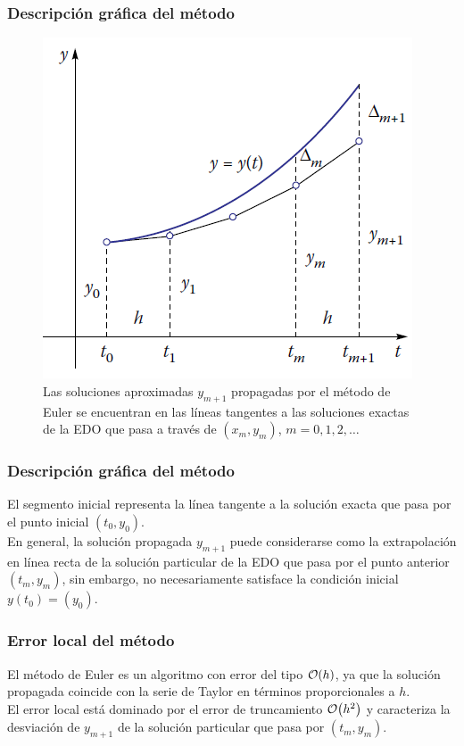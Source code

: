 \begin{frame}
\frametitle{Descripción gráfica del método}
\begin{figure}[h!]
    \centering
    \includegraphics[scale=0.5]{Imagenes/metodoEuler_01.png}
    \caption{Las soluciones aproximadas $y_{m + 1}$ propagadas por el método de Euler se encuentran en las líneas tangentes a las soluciones exactas de la EDO que pasa a través de $(x_{m}, y_{m})$, $m = 0, 1, 2, \ldots$}
    \label{fig:figura_12_01}
\end{figure}
\end{frame}
\begin{frame}
\frametitle{Descripción gráfica del método}
El segmento inicial representa la línea tangente a la solución exacta que pasa por el punto inicial $(t_{0}, y_{0})$.
\\
\bigskip
En general, la solución propagada $y_{m + 1}$ puede considerarse como la extrapolación en línea recta de la solución particular de la EDO que pasa por el punto anterior $(t_{m}, y_{m})$, sin embargo, no necesariamente satisface la condición inicial $y(t_{0}) = ( y_{0})$.
\end{frame}
\begin{frame}
\frametitle{Error local del método}
El método de Euler es un algoritmo con error del tipo $\order{h}$, ya que la solución propagada coincide con la serie de Taylor en términos proporcionales a $h$.
\\
\bigskip
El error local está dominado por el error de truncamiento $\order{h^{2}}$ y caracteriza la desviación de $y_{m + 1}$ de la solución particular que pasa por $(t_{m}, y_{m})$.
\end{frame}
